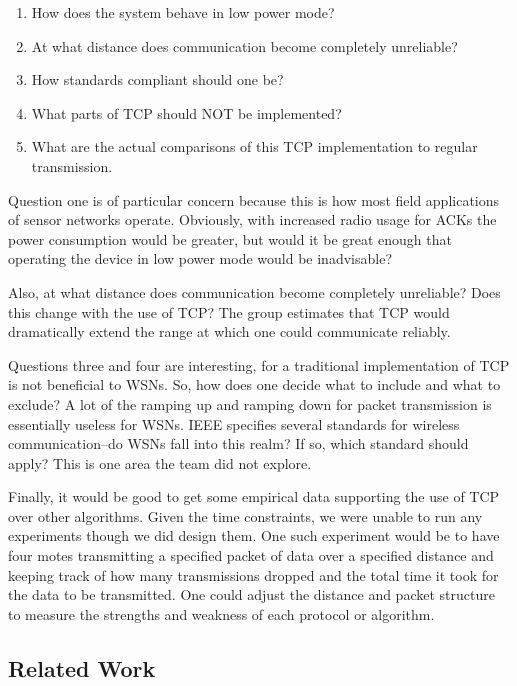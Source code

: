 \documentclass{sig-alternate}
\begin{document}
\begin{enumerate}\setlength{\itemsep}{1pt}
   \item How does the system behave in low power mode? 
   \item At what distance does communication become completely unreliable? 
   \item How standards compliant should one be? 
   \item What parts of TCP should NOT be implemented?
   \item What are the actual comparisons of this TCP implementation to regular transmission.
\end{enumerate}

Question one is of particular concern because this is how most field applications of sensor networks operate. Obviously, with increased radio usage for ACKs the power consumption would be greater, but would it be great enough that operating the device in low power mode would be inadvisable? 

Also, at what distance does communication become completely unreliable? Does this change with the use of TCP? The group estimates that TCP would dramatically extend the range at which one could communicate reliably.

Questions three and four are interesting, for a traditional implementation of TCP is not beneficial to WSNs. So, how does one decide what to include and what to exclude? A lot of the ramping up and ramping down for packet transmission is essentially useless for WSNs. IEEE specifies several standards for wireless communication--do WSNs fall into this realm? If so, which standard should apply? This is one area the team did not explore.

Finally, it would be good to get some empirical data supporting the use of TCP over other algorithms. Given the time constraints, we were unable to run any experiments though we did design them. One such experiment would be to have four motes transmitting a specified packet of data over a specified distance and keeping track of how many transmissions dropped and the total time it took for the data to be transmitted. One could adjust the distance and packet structure to measure the strengths and weakness of each protocol or algorithm.

\subsection{Related Work}\label{rwork}
\end{document}

